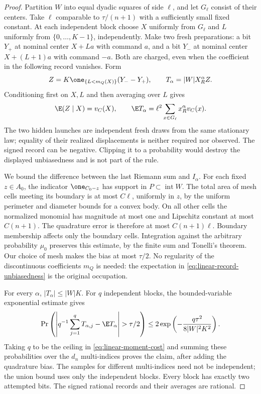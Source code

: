 \begin{proof}
Partition $W$ into equal dyadic squares of side $\ell$, and let
$G_\ell$ consist of their centers. Take $\ell$ comparable to
$\tau/(n+1)$ with a sufficiently small fixed constant. At each
independent block choose $X$ uniformly from $G_\ell$ and $L$
uniformly from $\{0,\ldots,K-1\}$, independently. Make two fresh
preparations: a bit $Y_+$ at nominal center $X+La$ with command $a$,
and a bit $Y_-$ at nominal center $X+(L+1)a$ with command $-a$.
Both are charged, even when the coefficient in the following record
vanishes. Form
\begin{equation}\label{eq:linear-two-bit-record}
 Z=K\one_{\{L<m_Q(X)\}}(Y_--Y_+),
           \qquad T_\alpha=|W|X_R^\alpha Z.
\end{equation}
Conditioning first on $X,L$ and then averaging over $L$ gives
\begin{equation}\label{eq:linear-record-unbiasedness}
 \E(Z\mid X)=v_C(X),\qquad
 \E T_\alpha=\ell^2\sum_{x\in G_\ell}x_R^\alpha v_C(x).
\end{equation}
The two hidden launches are independent fresh draws from the same
stationary law; equality of their realized displacements is neither
required nor observed. The signed record can be negative. Clipping
it to a probability would destroy the displayed unbiasedness and
is not part of the rule.

We bound the difference between the last Riemann sum and $I_\alpha$.
For each fixed $z\in A_0$, the indicator $\one_{C_0-z}$ has support
in $P\subset\operatorname{int}W$. The total area of mesh cells
meeting its boundary is at most $C\ell$, uniformly in $z$, by the
uniform perimeter and diameter bounds for a convex body. On all
other cells the normalized monomial has magnitude at most one and
Lipschitz constant at most $C(n+1)$. The quadrature error is therefore
at most $C(n+1)\ell$. Boundary membership affects only the boundary
cells. Integration against the arbitrary probability $\mu_0$
preserves this estimate, by the finite sum and Tonelli's theorem.
Our choice of mesh makes the bias at most $\tau/2$. No regularity
of the discontinuous coefficients $m_Q$ is needed: the expectation
in \eqref{eq:linear-record-unbiasedness} is the original occupation.

For every $\alpha$, $|T_\alpha|\le |W|K$. For $q$ independent
blocks, the bounded-variable exponential estimate gives
\[
 \Pr\left(\left|q^{-1}\sum_{j=1}^qT_{\alpha,j}
                  -\E T_\alpha\right|>\tau/2\right)
       \le 2\exp\left(-\frac{q\tau^2}{8|W|^2K^2}\right).
\]
Taking $q$ to be the ceiling in \eqref{eq:linear-moment-cost} and
summing these probabilities over the $d_n$ multi-indices proves the
claim, after adding the quadrature bias. The samples for different
multi-indices need not be independent; the union bound uses only
the independent blocks. Every block has exactly two attempted bits.
The signed rational records and their averages are rational.


\end{proof}
